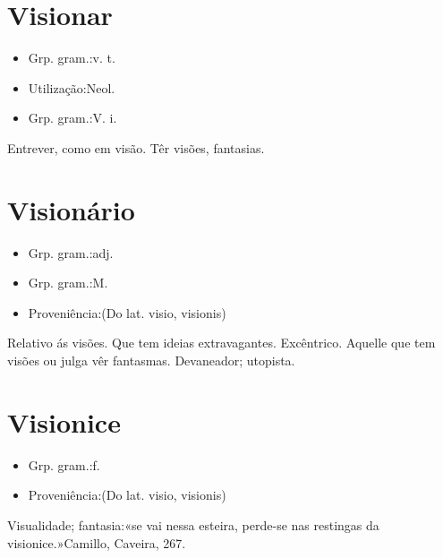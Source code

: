 \documentclass{article}
\begin{document}
\section{Visionar}
\begin{itemize}
\item {Grp. gram.:v. t.}
\end{itemize}
\begin{itemize}
\item {Utilização:Neol.}
\end{itemize}
\begin{itemize}
\item {Grp. gram.:V. i.}
\end{itemize}
Entrever, como em visão.
Têr visões, fantasias.
\section{Visionário}
\begin{itemize}
\item {Grp. gram.:adj.}
\end{itemize}
\begin{itemize}
\item {Grp. gram.:M.}
\end{itemize}
\begin{itemize}
\item {Proveniência:(Do lat. \textunderscore visio\textunderscore , \textunderscore visionis\textunderscore )}
\end{itemize}
Relativo ás visões.
Que tem ideias extravagantes.
Excêntrico.
Aquelle que tem visões ou julga vêr fantasmas.
Devaneador; utopista.
\section{Visionice}
\begin{itemize}
\item {Grp. gram.:f.}
\end{itemize}
\begin{itemize}
\item {Proveniência:(Do lat. \textunderscore visio\textunderscore , \textunderscore visionis\textunderscore )}
\end{itemize}
Visualidade; fantasia:«\textunderscore se vai nessa esteira, perde-se nas restingas da visionice.\textunderscore »Camillo, \textunderscore Caveira\textunderscore , 267.
\end{document}
